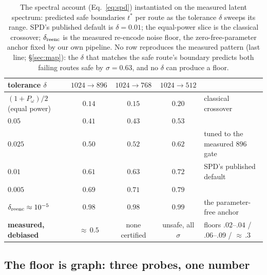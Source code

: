 \begin{table}[t]
\caption{The spectral account (Eq.~\ref{eq:spd}) instantiated on the
measured latent spectrum: predicted safe boundaries $t^{*}$ per route as
the tolerance $\delta$ sweeps its range. SPD's published default is
$\delta = 0.01$; the
equal-power slice is the classical crossover; $\delta_{\mathrm{reenc}}$ is the
measured re-encode noise floor, the zero-free-parameter anchor fixed by
our own pipeline. No row reproduces the
measured pattern (last line; \S\ref{sec:map}): the $\delta$ that matches
the safe route's
boundary predicts both failing routes safe by $\sigma = 0.63$, and no
$\delta$ can produce a floor.}
\label{tab:null}
\centering
\small
\setlength{\tabcolsep}{4pt}
\begin{tabular}{lcccl}
\toprule
tolerance $\delta$ & $1024{\to}896$ & $1024{\to}768$ & $1024{\to}512$ & \\
\midrule
$(1+P_\omega)/2$ (equal power) & $0.14$ & $0.15$ & $0.20$ & classical crossover \\
$0.05$ & $0.41$ & $0.43$ & $0.53$ & \\
$0.025$ & $0.50$ & $0.52$ & $0.62$ & tuned to the measured $896$ gate \\
$0.01$ & $0.61$ & $0.63$ & $0.72$ & SPD's published default \\
$0.005$ & $0.69$ & $0.71$ & $0.79$ & \\
$\delta_{\mathrm{reenc}} \approx 10^{-5}$ & $0.98$ & $0.98$ & $0.99$ & the parameter-free anchor \\
\midrule
\textbf{measured, debiased} & ${\approx}\,0.5$ &
none certified & unsafe, all $\sigma$ & floors $.02$--$.04$ / $.06$--$.09$ / ${\approx}\,.3$ \\
\bottomrule
\end{tabular}
\end{table}

\subsection{The floor is graph: three probes, one number}
\label{sec:floor}

